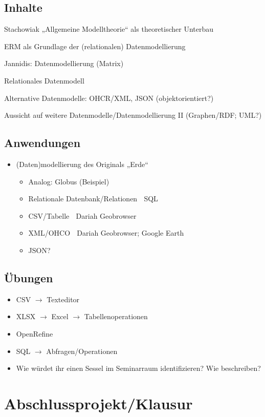 \newpage 
\subsection{Inhalte}
    \item Stachowiak „Allgemeine Modelltheorie“ als theoretischer Unterbau
    \item ERM als Grundlage der (relationalen) Datenmodellierung
    \item Jannidis: Datenmodellierung (Matrix)
    \item Relationales Datenmodell
    \item Alternative Datenmodelle: OHCR/XML, JSON (objektorientiert?)
    \item Aussicht auf weitere Datenmodelle/Datenmodellierung II (Graphen/RDF; UML?)

\subsection{Anwendungen}
    \begin{itemize}
        \item  (Daten)modellierung des Originals „Erde“
        \begin{itemize}
        \item Analog: Globus (Beispiel)
        \item Relationale Datenbank/Relationen  SQL
        \item CSV/Tabelle  Dariah Geobrowser 
        \item XML/OHCO  Dariah Geobrowser; Google Earth
        \item JSON?
        \end{itemize}
    \end{itemize}

\subsection{Übungen}
\begin{itemize}
    \item CSV $\to$ Texteditor
    \item XLSX $\to$ Excel $\to$ Tabellenoperationen
    \item OpenRefine
    \item SQL $\to$ Abfragen/Operationen
    \item Wie würdet ihr einen Sessel im Seminarraum identifizieren? Wie beschreiben?
\end{itemize}


\section{Abschlussprojekt/Klausur}


